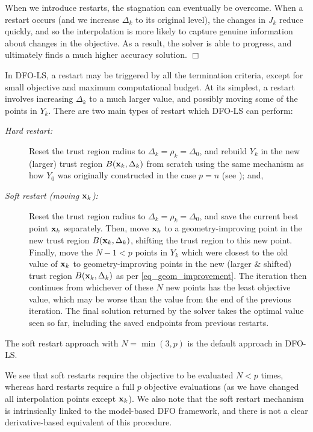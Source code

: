 When we introduce restarts, the stagnation can eventually be overcome. 
When a restart occurs (and we increase $\Delta_k$ to its original level), the changes in $J_k$ reduce quickly, and so the interpolation is more likely to capture genuine information about changes in the objective.
As a result, the solver is able to progress, and ultimately finds a much higher accuracy solution. $\Box$

In DFO-LS, a restart may be triggered by all the termination criteria, except for small objective and maximum computational budget.
At its simplest, a restart involves increasing $\Delta_k$ to a much larger value, and possibly moving some of the points in $Y_k$.
There are two main types of restart which DFO-LS can perform:
\begin{description}
	\item[\normalfont\textit{Hard restart:}] Reset the trust region radius to $\Delta_k=\rho_k=\Delta_0$, and rebuild $Y_k$ in the new (larger) trust region $B(\mathbf{x}_k,\Delta_k)$ from scratch using the same mechanism as how $Y_0$ was originally constructed in the case $p=n$ (see ); and,
	\item[\normalfont\textit{Soft restart (moving $\mathbf{x}_k$):}] Reset the trust region radius to $\Delta_k=\rho_k=\Delta_0$, and save the current best point $\mathbf{x}_k$ separately. Then, move $\mathbf{x}_k$ to a geometry-improving point in the new trust region $B(\mathbf{x}_k,\Delta_k)$, shifting the trust region to this new point. Finally, move the $N-1<p$ points in $Y_k$ which were closest to the old value of $\mathbf{x}_k$ to geometry-improving points in the new (larger \& shifted) trust region $B(\mathbf{x}_k,\Delta_k)$ as per \eqref{eq_geom_improvement}. The iteration then continues from whichever of these $N$ new points has the least objective value, which may be worse than the value from the end of the previous iteration. The final solution returned by the solver takes the optimal value seen so far, including the saved endpoints from previous restarts.
\end{description}
The soft restart approach with $N=\min(3,p)$ is the default approach in DFO-LS.

We see that soft restarts require the objective to be evaluated $N<p$ times, whereas hard restarts require a full $p$ objective evaluations (as we have changed all interpolation points except $\mathbf{x}_k$).
We also note that the soft restart mechanism is intrinsically linked to the model-based DFO framework, and there is not a clear derivative-based equivalent of this procedure.

